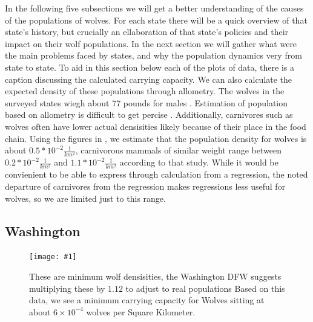 \documentclass[12pt]{article}
\newcommand{\rimage}[2]{
\begin{figure}
    \begin{center}
\texttt{[image: \#1]}
\caption{#2}
    \end{center}
\end{figure}
}
\begin{document}
In the following five subsections we will get a better understanding of the causes of the populations of wolves. 
For each state there will be a quick overview of that state's history, but crucially an ellaboration 
of that state's policies and their impact on their wolf populations.
In the next section we will gather what were the main problems faced by states,
    and why the population dynamics very from state to state.
To aid in this section below each of the plots of data, 
    there is a caption discussing the calculated carrying capacity.
We can also calculate the expected density of these populations through allometry.
The wolves in the surveyed states wiegh about 77 pounds for males \cite{1999ManageWI}.
Estimation of population based on allometry is difficult to get percise \cite{1995Allometric}.
Additionally, carnivores such as wolves often have lower actual densisities \cite{1995Allometric} likely because of their place in the food chain.
Using the figures in \cite{1995Allometric}, we estimate that the population density for wolves is about $0.5*10^{-2} \frac{1}{km^2}$,
    carnivorous mammals of similar weight range between $0.2*10^{-2} \frac{1}{km^2}$ and $1.1*10^{-2} \frac{1}{km^2}$
    according to that study.
While it would be convienient to be able to express through calculation from a regression, 
    the noted departure of carnivores from the regression makes regressions less useful for wolves,
    so we are limited just to this range.

\subsection{Washington}
\rimage{washington.png}{These are minimum wolf densisities, the Washington DFW suggests multiplying these by $1.12$ to adjust to real populations
    Based on this data, we see a minimum carrying capacity for Wolves sitting at about $6 \times 10^{-4}$ wolves per Square Kilometer.
}
\end{document}
